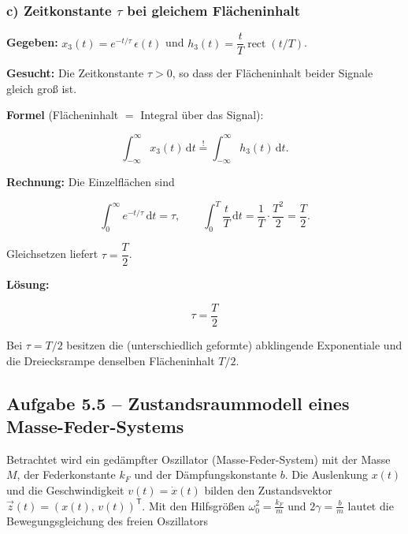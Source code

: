 \subsubsection*{c) Zeitkonstante $\tau$ bei gleichem Flächeninhalt}

\begin{beispiel}

\textbf{Gegeben:} $x_3(t) = e^{-t/\tau}\,\epsilon(t)$ und
$h_3(t) = \dfrac{t}{T}\operatorname{rect}(t/T)$.

\textbf{Gesucht:} Die Zeitkonstante $\tau > 0$, so dass der Flächeninhalt beider
Signale gleich groß ist.

\textbf{Formel} (Flächeninhalt $=$ Integral über das Signal):

$$
\int_{-\infty}^{\infty} x_3(t)\,\mathrm{d}t
\overset{!}{=} \int_{-\infty}^{\infty} h_3(t)\,\mathrm{d}t.
$$

\textbf{Rechnung:} Die Einzelflächen sind

$$
\int_{0}^{\infty} e^{-t/\tau}\,\mathrm{d}t = \tau,
\qquad
\int_{0}^{T} \frac{t}{T}\,\mathrm{d}t = \frac{1}{T}\cdot\frac{T^2}{2} = \frac{T}{2}.
$$

Gleichsetzen liefert $\tau = \dfrac{T}{2}$.

\textbf{Lösung:}

$$
\boxed{\;\tau = \frac{T}{2}\;}
$$

Bei $\tau = T/2$ besitzen die (unterschiedlich geformte) abklingende Exponentiale
und die Dreiecksrampe denselben Flächeninhalt $T/2$.

\end{beispiel}

\subsection*{Aufgabe 5.5 – Zustandsraummodell eines Masse-Feder-Systems}

Betrachtet wird ein gedämpfter Oszillator (Masse-Feder-System) mit der Masse
$M$, der Federkonstante $k_F$ und der Dämpfungskonstante $b$. Die Auslenkung
$x(t)$ und die Geschwindigkeit $v(t) = \dot{x}(t)$ bilden den Zustandsvektor
$\vec{z}(t) = (x(t),\, v(t))^{\mathsf{T}}$. Mit den Hilfsgrößen $\omega_0^2 =
\tfrac{k_F}{m}$ und $2\gamma = \tfrac{b}{m}$ lautet die Bewegungsgleichung des
freien Oszillators

